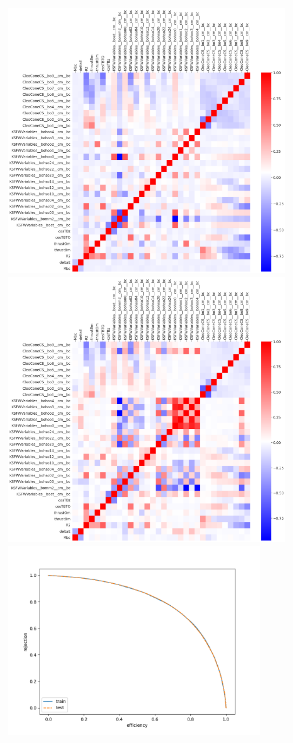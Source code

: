 \begin{figure}[H]
	\begin{minipage}[b]{0.5\linewidth}
		\centering 
		\includegraphics[height=7cm]{figures/corr_cs_kine_sig}	
	\end{minipage}
\begin{minipage}[b]{0.5\linewidth}
	\centering 
	\includegraphics[height=7cm]{figures/corr_cs_kine_bkg}	
\end{minipage}
	\begin{minipage}[b]{0.5\linewidth}
		\centering 
		\includegraphics[height=5cm]{figures/ROC_CS}	
	\end{minipage}
	\begin{minipage}[b]{0.5\linewidth}
		\centering 

\end{minipage}
\end{figure}
